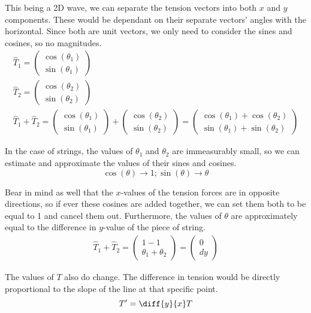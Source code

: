 \documentclass{article}
\begin{document}
    This being a 2D wave, we can separate the tension vectors into both $x$ and $y$ components.
    These would be dependant on their separate vectors' angles with the horizontal.
    Since both are unit vectors, we only need to consider the sines and cosines, so no magnitudes.
    \begin{gather}
        \hat{T}_1 = \begin{pmatrix} \cos(\theta_1) \\ \sin(\theta_1) \end{pmatrix}\\
        \hat{T}_2 = \begin{pmatrix} \cos(\theta_2) \\ \sin(\theta_2) \end{pmatrix}\\
        \hat{T}_1 + \hat{T}_2 = \begin{pmatrix} \cos(\theta_1) \\ \sin(\theta_1) \end{pmatrix} + \begin{pmatrix} \cos(\theta_2) \\ \sin(\theta_2) \end{pmatrix}
            =   \begin{pmatrix} \cos(\theta_1) + \cos(\theta_2) \\ \sin(\theta_1) + \sin(\theta_2) \end{pmatrix}
    \end{gather}

    In the case of strings, the values of $\theta_1$ and $\theta_2$ are immeasurably small, so we can estimate and approximate the values of their sines and cosines.
    \begin{equation}
        \cos(\theta) \to 1 ; 
        \sin(\theta) \to \theta
    \end{equation}

    Bear in mind as well that the $x$-values of the tension forces are in opposite directions, so if ever these cosines are added together, we can set them both to be equal to 1 and cancel them out.
    Furthermore, the values of $\theta$ are approximately equal to the difference in $y$-value of the piece of string.
    \begin{gather}
        \hat{T}_1 + \hat{T}_2   =   \begin{pmatrix} 1 - 1 \\ \theta_1 + \theta_2 \end{pmatrix}
            =   \begin{pmatrix} 0 \\ dy \end{pmatrix}
    \end{gather}

    The values of $T$ also do change.
    The difference in tension would be directly proportional to the slope of the line at that specific point.
    \begin{equation}
        T' = \diff{y}{x} T
    \end{equation}
\end{document}
